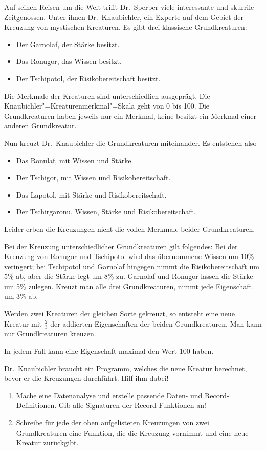 \begin{aufgabe}
  \label{aufgabe:knaubichler}
  Auf seinen Reisen um die Welt trifft Dr.~Sperber
  viele interessante und skurrile Zeitgenossen. Unter ihnen
  Dr.~Knaubichler, ein Experte auf dem Gebiet der Kreuzung von
  mystischen Kreaturen.  Es gibt drei klassische Grundkreaturen:

  \begin{itemize}
  \item Der Garnolaf, der Stärke besitzt.
  \item Das Ronugor, das Wissen besitzt.
  \item Der Tschipotol, der Risikobereitschaft besitzt.
  \end{itemize}
  Die Merkmale der Kreaturen sind unterschiedlich ausgeprägt.  Die
  Knaubichler"=Kreaturenmerkmal"=Skala geht von 0 bis 100.  Die
  Grundkreaturen haben jeweils nur ein Merkmal, keine besitzt ein
  Merkmal einer anderen Grundkreatur.

  Nun kreuzt Dr.~Knaubichler die Grundkreaturen miteinander. Es
  entstehen also
  \begin{itemize}
  \item Das Ronulaf, mit Wissen und Stärke.
  \item Der Tschigor, mit Wissen und Risikobereitschaft.
  \item Das Lapotol, mit Stärke und Risikobereitschaft.
  \item Der Tschirgaronu, Wissen, Stärke und Risikobereitschaft.
  \end{itemize}
  Leider erben die Kreuzungen nicht die vollen Merkmale beider
  Grundkreaturen.

  Bei der Kreuzung unterschiedlicher Grundkreaturen gilt folgendes:
  Bei der Kreuzung von Ronugor und Tschipotol wird
  das übernommene Wissen um 10\% veringert; bei Tschipotol und
  Garnolaf hingegen nimmt die Risikobereitschaft um 5\% ab, aber die
  Stärke legt um 8\% zu. Garnolaf und Ronugor lassen die Stärke um 5\%
  zulegen. Kreuzt man alle drei Grundkreaturen, nimmt jede Eigenschaft
  um 3\% ab.
  
  Werden zwei Kreaturen der gleichen Sorte gekreuzt, so entsteht eine
  neue Kreatur mit $\frac{2}{3}$ der addierten Eigenschaften der
  beiden Grundkreaturen. Man kann nur Grundkreaturen kreuzen.

  In jedem Fall kann eine Eigenschaft maximal den Wert 100
  haben.
    
  Dr.~Knaubichler braucht ein Programm, welches die neue Kreatur
  berechnet, bevor er die Kreuzungen durchführt.  Hilf ihm
  dabei!
  
  \begin{enumerate}

  \item Mache eine Datenanalyse und erstelle
    passende Daten- und Record-Definitionen.  Gib alle
    Signaturen der Record-Funktionen an!

  \item Schreibe für jede der oben aufgelisteten
    Kreuzungen von zwei Grundkreaturen eine Funktion, die die Kreuzung
    vornimmt und eine neue Kreatur zurückgibt.
  \end{enumerate}
\end{aufgabe}


